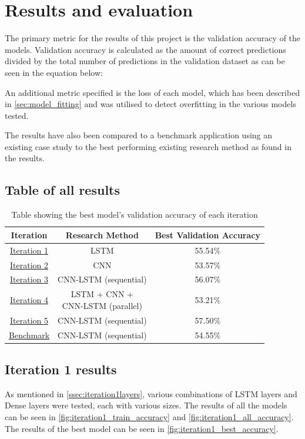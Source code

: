 \chapter{Results and evaluation} \label{chap:results}
The primary metric for the results of this project is the validation accuracy of the models. Validation accuracy is calculated as
the amount of correct predictions divided by the total number of predictions in the validation dataset as can be seen in the equation below:

An additional metric specified is the loss of each model, which has been described in \autoref{sec:model_fitting} and was
utilised to detect overfitting in the various models tested.

The results have also been compared to a benchmark application using an existing case study to the 
best performing existing research method as found in the results. 

\section{Table of all results}
\begin{table}[ht]
    \centering
    \begin{tabular}{|c|c|c|}
        \hline
        Iteration & Research Method & Best Validation Accuracy \\
        \hline\hline
        \hyperref[iteration1_results]{Iteration 1} & LSTM & 55.54\%\\
        \hyperref[iteration2_results]{Iteration 2} & CNN & 53.57\%\\
        \hyperref[iteration3_results]{Iteration 3} & CNN-LSTM (sequential) & 56.07\%\\
        \hyperref[iteration4_results]{Iteration 4} & \makecell{LSTM + CNN +\\ CNN-LSTM (parallel)} & 53.21\%\\
        \hyperref[iteration5_results]{Iteration 5} & CNN-LSTM (sequential) & 57.50\%\\
        \hyperref[benchmark_results]{Benchmark} & CNN-LSTM (sequential) & 54.55\%\\
        \hline
    \end{tabular}
    \caption{Table showing the best model's validation accuracy of each iteration}
    \label{tab:all_results_overview}
\end{table}
\FloatBarrier

\section{Iteration 1 results}\label{iteration1_results}
As mentioned in \autoref{ssec:iteration1layers}, various combinations of LSTM layers and Dense layers were tested,
each with various sizes. The results of all the models can be seen in \autoref{fig:iteration1_train_accuracy}
and \autoref{fig:iteration1_all_accuracy}.\\
The results of the best model can be seen in \autoref{fig:iteration1_best_accuracy}.

